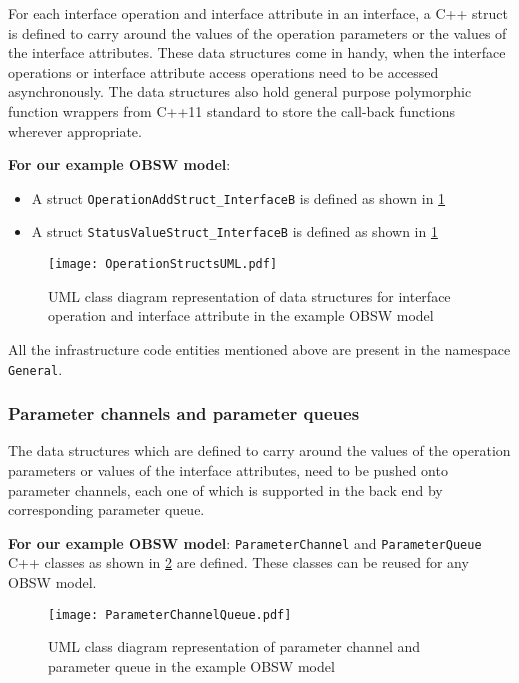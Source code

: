 For each interface operation and interface attribute in an interface, a C++ struct is defined to carry around the values of the operation parameters or the values of the interface attributes. These data structures come in handy, when the interface operations or interface attribute access operations need to be accessed asynchronously. The data structures also hold general purpose polymorphic function wrappers from C++11 standard to store the call-back functions wherever appropriate. 

\textbf{For our example OBSW model}:
\begin{itemize}
\item A struct \texttt{OperationAdd\allowbreak Struct\_\allowbreak InterfaceB} is defined as shown in \cref{fig: Operation structs UML}
\item A struct \texttt{StatusValue\allowbreak Struct\_\allowbreak InterfaceB} is defined as shown in \cref{fig: Operation structs UML}
\end{itemize} 

\begin{figure}[h]
	\centering
	\texttt{[image: OperationStructsUML.pdf]}
	\caption{UML class diagram representation of data structures for interface operation and interface attribute in the example OBSW model}
	\label{fig: Operation structs UML}
\end{figure} 

All the infrastructure code entities mentioned above are present in the namespace \texttt{General}.

\subsubsection{\textbf{Parameter channels and parameter queues}}
The data structures which are defined to carry around the values of the operation parameters or values of the interface attributes, need to be pushed onto parameter channels, each one of which is supported in the back end by corresponding parameter queue.

\textbf{For our example OBSW model}: \texttt{Parameter\allowbreak Channel} and \texttt{Parameter\allowbreak Queue} C++ classes as shown in \cref{fig: Parameter channel UML} are defined. These classes can be reused for any OBSW model. 

\begin{figure}[h]
	\centering
	\texttt{[image: ParameterChannelQueue.pdf]}
	\caption{UML class diagram representation of parameter channel and parameter queue in the example OBSW model}
	\label{fig: Parameter channel UML}
\end{figure}

